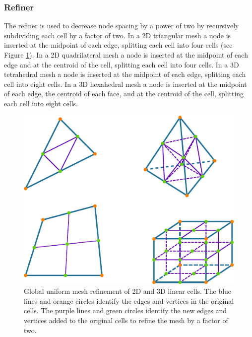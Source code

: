 \subsubsection{Refiner}

The refiner is used to decrease node spacing by a power of two by
recursively subdividing each cell by a factor of two. In a 2D triangular
mesh a node is inserted at the midpoint of each edge, splitting each
cell into four cells (see Figure \ref{fig:uniform:refinement:2x}).
In a 2D quadrilateral mesh a node is inserted at the midpoint of each
edge and at the centroid of the cell, splitting each cell into four
cells. In a 3D tetrahedral mesh a node is inserted at the midpoint
of each edge, splitting each cell into eight cells. In a 3D hexahedral
mesh a node is inserted at the midpoint of each edge, the centroid
of each face, and at the centroid of the cell, splitting each cell
into eight cells.

\noindent \begin{center}
\begin{figure}[H]
\noindent \begin{centering}
\includegraphics[scale=1.25]{runpylith/figs/refinement2x}
\par\end{centering}

\caption{Global uniform mesh refinement of 2D and 3D linear cells. The blue
lines and orange circles identify the edges and vertices in the original
cells. The purple lines and green circles identify the new edges and
vertices added to the original cells to refine the mesh by a factor
of two.\label{fig:uniform:refinement:2x}}
\end{figure}

\par\end{center}

